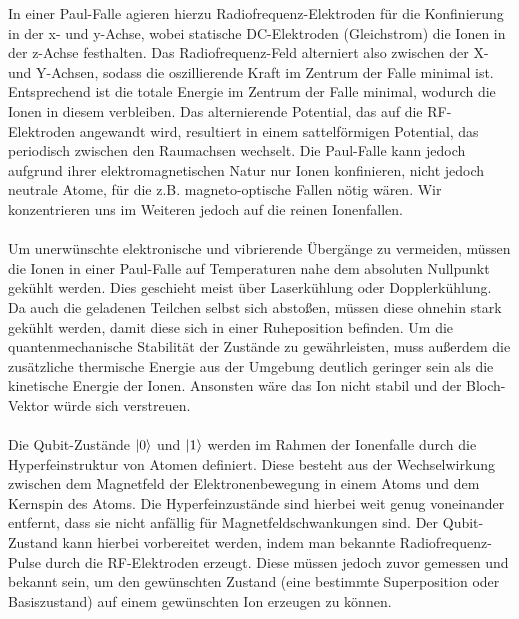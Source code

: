 In einer Paul-Falle agieren hierzu Radiofrequenz-Elektroden für die Konfinierung in der x- und y-Achse, wobei statische DC-Elektroden (Gleichstrom) die Ionen in der z-Achse festhalten. Das Radiofrequenz-Feld alterniert also zwischen der X- und Y-Achsen, sodass die oszillierende Kraft im Zentrum der Falle minimal ist. Entsprechend ist die totale Energie im Zentrum der Falle minimal, wodurch die Ionen in diesem verbleiben. \cite{kasirajan_fundamentals_2021}
Das alternierende Potential, das auf die RF-Elektroden angewandt wird, resultiert in einem sattelförmigen Potential, das periodisch zwischen den Raumachsen wechselt. Die Paul-Falle kann jedoch aufgrund ihrer elektromagnetischen Natur nur Ionen konfinieren, nicht jedoch neutrale Atome, für die z.B. magneto-optische Fallen nötig wären. Wir konzentrieren uns im Weiteren jedoch auf die reinen Ionenfallen. \cite{lapierre_getting_2022} %
\\
\\
Um unerwünschte elektronische und vibrierende Übergänge zu vermeiden, müssen die Ionen in einer Paul-Falle auf Temperaturen nahe dem absoluten Nullpunkt gekühlt werden. Dies geschieht meist über Laserkühlung oder Dopplerkühlung. \cite{lapierre_introduction_2021} %
Da auch die geladenen Teilchen selbst sich abstoßen, müssen diese ohnehin stark gekühlt werden, damit diese sich in einer Ruheposition befinden. \cite{homeister_quantum_2022}
Um die quantenmechanische Stabilität der Zustände zu gewährleisten, muss außerdem die zusätzliche thermische Energie aus der Umgebung deutlich geringer sein als die kinetische Energie der Ionen. Ansonsten wäre das Ion nicht stabil und der Bloch-Vektor würde sich verstreuen. \cite{kasirajan_fundamentals_2021} %
\\
\\
Die Qubit-Zustände $\ket0$ und $\ket1$ werden im Rahmen der Ionenfalle durch die Hyperfeinstruktur von Atomen definiert. Diese besteht aus der Wechselwirkung zwischen dem Magnetfeld der Elektronenbewegung in einem Atoms und dem Kernspin des Atoms. Die Hyperfeinzustände sind hierbei weit genug voneinander entfernt, dass sie nicht anfällig für Magnetfeldschwankungen sind. \cite{kasirajan_fundamentals_2021} %
Der Qubit-Zustand kann hierbei vorbereitet werden, indem man bekannte Radiofrequenz-Pulse durch die RF-Elektroden erzeugt. Diese müssen jedoch zuvor gemessen und bekannt sein, um den gewünschten Zustand (eine bestimmte Superposition oder Basiszustand) auf einem gewünschten Ion erzeugen zu können.\cite{kasirajan_fundamentals_2021}%

